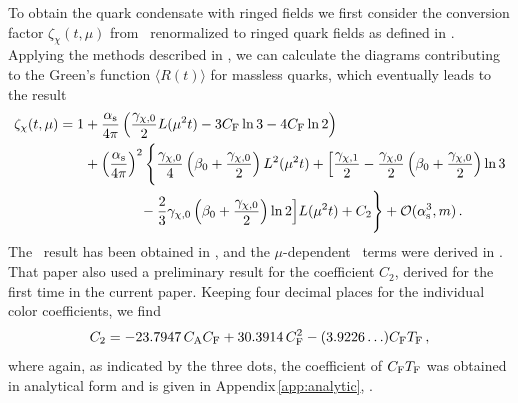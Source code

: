 To obtain the quark condensate with ringed fields we first consider the
conversion factor $\zeta_\chi(t,\mu)$ from \msbar\ renormalized to
ringed quark fields as defined in . Applying the methods
described in , we can calculate the diagrams contributing
to the Green's function $\langle R(t)\rangle$ for massless quarks, which
eventually leads to the result
\begin{equation}
	\begin{split}
	  \zeta_\chi(t,\mu) = 1 &+ \frac{\alpha_\mathrm{s}}{4\pi} \left(
          \frac{\gamma_{\chi, 0}}{2} L(\mu^2t) - 3 C_\mathrm{F} \ln 3 - 4 C_\mathrm{F} \ln
          2 \right) \\ &+ \left(\frac{\alpha_\mathrm{s}}{4\pi}\right)^2 \Bigg\{
          \frac{\gamma_{\chi, 0}}{4} \left( \beta_0 +
          \frac{\gamma_{\chi, 0}}{2} \right) L^2 (\mu^2t) + \Big[
            \frac{\gamma_{\chi, 1}}{2} - \frac{\gamma_{\chi, 0}}{2}
            \left( \beta_0 + \frac{\gamma_{\chi, 0}}{2} \right) \ln 3
            \\ & \qquad \qquad - \frac{2}{3} \gamma_{\chi, 0} \left(
            \beta_0 + \frac{\gamma_{\chi, 0}}{2}\right) \ln 2 \Big]
          L(\mu^2t) + C_2 \Bigg\} + {\cal O}(\alpha_\mathrm{s}^3,m) \,.
                \label{eq:zfchi}
	\end{split}
\end{equation}
The \nlo\ result has been obtained in , and the
$\mu$-dependent \nnlo\ terms were derived in
. That paper also used a preliminary result
for the coefficient $C_2$, derived for the first time in the current
paper. Keeping four decimal places for the individual color coefficients,
we find
\begin{equation}
  C_2 = -23.7947 \, C_\mathrm{A} C_\mathrm{F} + 30.3914 \, C_\mathrm{F}^2 -(3.9226\ldots) C_\mathrm{F}
  T_\mathrm{F}\,,
  \label{eq:c2}
\end{equation}
where again, as indicated by the three dots, the coefficient of $C_\mathrm{F}T_\mathrm{F}$
was obtained in analytical form and is given in
Appendix\,\ref{app:analytic}, .

